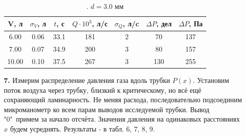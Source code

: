 \documentclass[a4paper]{article}
\begin{document}
\begin{itemize}
\begin{table}[]
\centering
\begin{tabular}{|c|c|c|c|c|c|c|}
\hline
V, л  & $\sigma_{V}$, л & $t$, с & $Q \cdot 10^{3}$, л/с & $\sigma_Q$, л/c & $\Delta P$, дел             & $\Delta P$, Па              \\ \hline
6.00  & 0.06            & 33.1   & 181                   & 2               & \cellcolor[HTML]{00FF00}70  & \cellcolor[HTML]{00FF00}137 \\ \hline
7.00  & 0.07            & 34.9   & 200                   & 3               & \cellcolor[HTML]{00FF00}80  & \cellcolor[HTML]{00FF00}157 \\ \hline
10.00 & 0.10            & 37.5   & 267                   & 3               & \cellcolor[HTML]{00FF00}130 & \cellcolor[HTML]{00FF00}255 \\ \hline
\end{tabular}
\caption{. $d = 3.0$ мм}
\end{table}

\item[\textbf{7. }] Измерим распределение давления газа вдоль трубки $P(x)$. Установим поток воздуха через трубку, близкий к критическому, но всё ещё сохраняющий ламинарность. Не меняя расхода, последовательно подсоединим микроманометр ко всем парам выводов исследуемой трубки. Вывод "0"\ примем за начало отсчёта. Значения давления на одинаковых расстояниях $x$ будем усреднять. Результаты - в табл. 6, 7, 8, 9.


\end{itemize}
\end{document}
